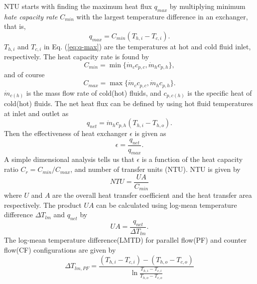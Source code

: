 NTU starts with finding the maximum heat flux $ q_{max} $ by multiplying minimum \textit{hate capacity rate} $ C_{min} $ with the largest temperature difference in an exchanger\cite{bergman2011fundamentals}, that is,
\begin{equation}
	q_{max} = C_{min}(T_{h,i}-T_{c,i}).
	\label{eq:q-max}
\end{equation}
$ T_{h,i} $ and $ T_{c,i} $ in Eq. (\ref{eq:q-max}) are the temperatures at hot and cold fluid inlet, respectively. The heat capacity rate is found by 
\begin{equation}
	C_{min} = \min\{\dot{m}_cc_{p,c}, \dot{m}_hc_{p,h}\},
\end{equation}
and of course
\begin{equation}
	C_{max} = \max\{\dot{m}_cc_{p,c}, \dot{m}_hc_{p,h}\}.
\end{equation}
$ \dot{m}_{c(h)} $ is the mass flow rate of cold(hot) fluids, and $ c_{p,c(h)} $ is the specific heat of cold(hot) fluids. The net heat flux can be defined by using hot fluid temperatures at inlet and outlet as
\begin{equation}
	q_{net} = \dot{m}_hc_{p,h}(T_{h,i}-T_{h,o}).
\end{equation}
Then the effectiveness of heat exchanger $ \epsilon $ is given as
\begin{equation}
	\epsilon= \frac{q_{net}}{q_{max}}.
	\label{eq:eps}
\end{equation}
A simple dimensional analysis tells us that $ \epsilon $ is a function of the heat capacity ratio $ C_r = C_{min}/C_{max} $, and number of transfer units (NTU). NTU is given by
\begin{equation}
	NTU = \frac{UA}{C_{min}}
	\label{eq:NTU}
\end{equation}
where $ U $ and $ A $ are  the overall heat transfer coefficient and the heat transfer area respectively. The product $ UA $ can be calculated using log-mean  temperature  difference $ \Delta T_{lm} $ and $ q_{net} $ by
\begin{equation}
	UA= \frac{q_{net}}{\Delta T_{lm}}.
	\label{eq:UA}
\end{equation}
The log-mean temperature difference(LMTD) for parallel flow(PF) and counter flow(CF) configurations are given by
\begin{equation}
	\Delta T_{l m, P F}=\frac{\left(T_{h, i}-T_{c, i}\right)-\left(T_{h, o}-T_{c, o}\right)}{\ln \frac{T_{h, i}-T_{c, i}}{T_{h, o}-T_{c, o}}}
	\label{eq:Tlmpf}
\end{equation}
